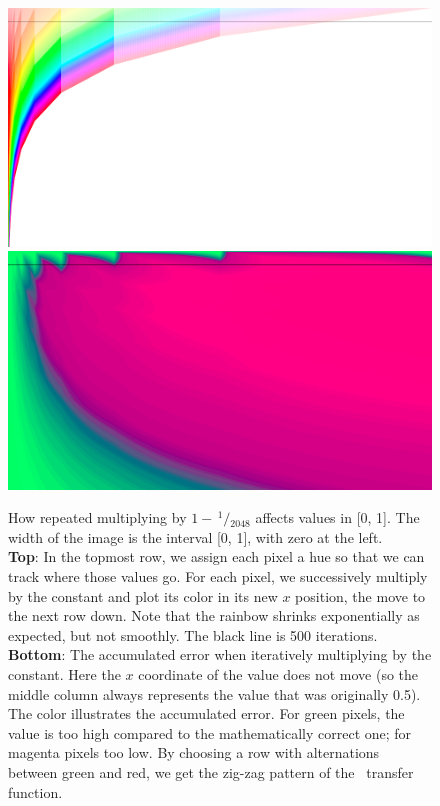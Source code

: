\documentclass[twocolumn]{article}
\newcommand\sfrac[2]{\!{}\,^{#1}\!/{}\!_{#2}}
\begin{document}
\begin{figure}[htp]
  \includegraphics[width=0.95 \linewidth]{rainbow} \\[1em]
  \includegraphics[width=0.95 \linewidth]{rainbow-error}
  \caption{
    How repeated multiplying by $1 - \sfrac{1}{2048}$ affects values in
    [0, 1].
    The width of the image is the interval [0, 1], with zero at the left.
    \\[1em]
    {\bf Top}: In the topmost row, we assign each pixel a hue so that
    we can track where those values go. For each pixel, we
    successively multiply by the constant and plot its color in its
    new $x$ position, the move to the next row down. Note that the
    rainbow shrinks exponentially as expected, but not smoothly.
    The black line is 500 iterations.
    \\[1em]
    {\bf Bottom}: The accumulated error when iteratively multiplying
    by the constant. Here the $x$ coordinate of the value does not move
    (so the middle column always represents the value that was
    originally 0.5). The color illustrates the accumulated error. For
    green pixels, the value is too high compared to the mathematically
    correct one; for magenta pixels too low. By choosing a row with
    alternations between green and red, we get the zig-zag pattern of
    the \gradone\ transfer function.
  } \label{fig:rainbow}
\end{figure}
\end{document}
